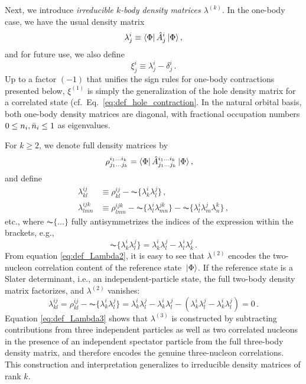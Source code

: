 Next, we introduce \emph{irreducible $k$-body density matrices $\lambda^{(k)}$}. In
the one-body case, we have the usual density matrix
\begin{equation}
  \lambda^{i}_{j} \equiv \langle{\Phi}|\,{\hat{A}^{i}_{j}}\,|{\Phi}\rangle\,,
\end{equation}
and for future use, we also define
\begin{equation}
  \xi^{i}_{j} \equiv \lambda^{i}_{j} - \delta^{i}_{j}\,.
\end{equation}
Up to a factor $(-1)$ that unifies the sign rules for one-body contractions
presented below, $\xi^{(1)}$ is simply the generalization of the hole 
density matrix for a correlated state (cf.~Eq.~\eqref{eq:def_hole_contraction}. 
In the natural orbital basis, both one-body density matrices are diagonal,
with fractional occupation numbers $0\leq n_i, \bar{n}_i \leq 1$ as eigenvalues. 

For $k\geq 2$, we denote full density matrices by
\begin{align}
  \rho^{i_1 \ldots i_k}_{j_1 \ldots j_k} &= 
    \langle{\Phi}|\,{\hat{A}^{i_1 \ldots i_k}_{j_1 \ldots j_k}}\,|{\Phi}\rangle\,,
\end{align}
and define
\begin{align}
  \lambda^{ij}_{kl} &\equiv \rho^{ij}_{kl} - \AC\{\lambda^{i}_{k}\lambda^{j}_{l}\}\,, \label{eq:def_Lambda2}\\
  \lambda^{ijk}_{lmn}&\equiv \rho^{ijk}_{lmn} - \AC\{\lambda^{i}_{l}\lambda^{jk}_{mn}\} -
                      \AC\{\lambda^{i}_{l}\lambda^{j}_{m}\lambda^{k}_{n}\}\,,\label{eq:def_Lambda3}
\end{align}
etc., where $\AC\{\ldots\}$ fully antisymmetrizes the indices of the expression
within the brackets, e.g.,
\begin{equation}
  \AC\{\lambda^{i}_{k}\lambda^{j}_{l}\} = \lambda^{i}_{k}\lambda^{j}_{l} - 
    \lambda^{i}_{l}\lambda^{j}_{k}\,.
\end{equation}
From equation \eqref{eq:def_Lambda2}, it is easy to see that $\lambda^{(2)}$ encodes the
two-nucleon correlation content of the reference state $\,|{\Phi}\rangle$. If 
the reference state is a Slater determinant, i.e., an independent-particle
state, the full two-body density matrix factorizes, and $\lambda^{(2)}$
vanishes:
\begin{equation}
  \lambda^{ij}_{kl} = \rho^{ij}_{kl} - \AC\{\lambda^{i}_{k}\lambda^{j}_{l}\}
  = \lambda^{i}_{k}\lambda^{j}_{l} -  \lambda^{i}_{k}\lambda^{j}_{l} - 
    \left(\lambda^{i}_{k}\lambda^{j}_{l} -  \lambda^{i}_{k}\lambda^{j}_{l}\right) = 0\,.
\end{equation}
Equation \eqref{eq:def_Lambda3} shows that $\lambda^{(3)}$ is constructed
by subtracting contributions from three independent particles as well as
two correlated nucleons in the presence of an independent spectator particle
from the full three-body density matrix, and therefore encodes the genuine
three-nucleon correlations. This construction and interpretation  
generalizes to irreducible density matrices of rank $k$.

